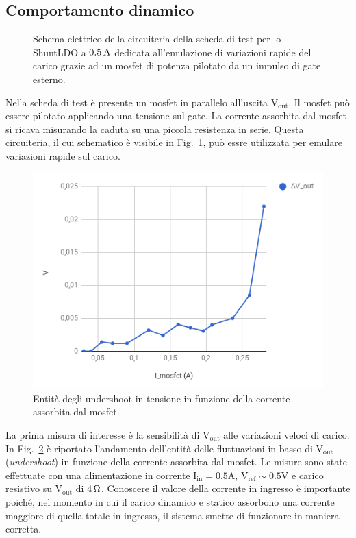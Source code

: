 \subsection{Comportamento dinamico}

\begin{figure}[!hbt]
\centering
\caption{Schema elettrico della circuiteria della scheda di test per lo ShuntLDO a $0.5\rm \, A$ dedicata all'emulazione di variazioni rapide del carico grazie ad un mosfet di potenza pilotato da un impulso di gate esterno.}
\label{SLDO5mosfet}
\end{figure}
Nella scheda di test è presente un mosfet in parallelo all'uscita $\mathrm{V_{out}}$. Il mosfet pu\`o essere pilotato applicando una tensione sul gate. La corrente assorbita dal mosfet si ricava misurando la caduta su una piccola resistenza in serie. Questa circuiteria, il cui schematico \`e visibile in Fig.~\ref{SLDO5mosfet}, pu\`o essre utilizzata per emulare variazioni rapide sul carico. 

\begin{figure}[!hbt]
\centering
\includegraphics[scale=.5]{Immagini/SLDO5singlepulse}
\caption{Entità degli undershoot in tensione in funzione della corrente assorbita dal mosfet.}
\label{SLDO5singlepulse}
\end{figure}
La prima misura di interesse è la sensibilità di $\mathrm{V_{out}}$ alle variazioni veloci di carico.
In Fig.~\ref{SLDO5singlepulse} è riportato l'andamento dell'entit\`a delle fluttuazioni in basso di $\mathrm{V_{out}}$ ({\em undershoot}) in funzione della corrente assorbita dal mosfet.
Le misure sono state effettuate con una alimentazione in corrente $\mathrm{I_{in} = 0.5 A}$, $\mathrm{V_{ref} \sim 0.5 V}$ e carico resistivo su $\mathrm{V_{out}}$ di $4{\rm \, \Omega}$. 
Conoscere il valore della corrente in ingresso è importante poiché, nel momento in cui il carico dinamico e statico assorbono una corrente maggiore di quella totale in ingresso, il sistema smette di funzionare in maniera corretta.


